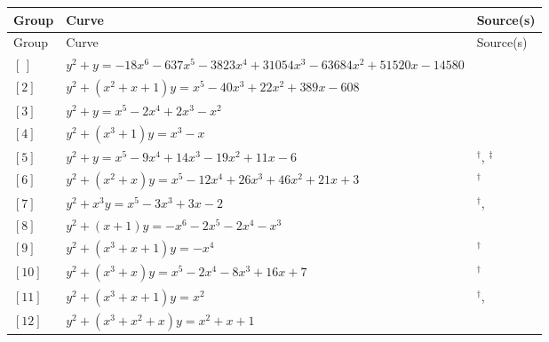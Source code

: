 \documentclass[11pt]{amsart}
\begin{document}
\begingroup\small
\renewcommand{\arraystretch}{1.25}
\begin{longtable}{|>{\raggedright\arraybackslash}p{1.7cm}|>{\raggedright\arraybackslash}p{}|>{\raggedright\arraybackslash}p{2.1cm}|}
\hline
Group & Curve & Source(s)\\ \hline
\endfirsthead
\hline
Group & Curve & Source(s)\\ \hline
\endhead
$[\,]$ & \href{https://alpha.lmfdb.org/Genus2Curve/Q/?jump=[[-14580,51520,-63684,31054,-3823,-637,-18],[1]]}{$y^2 + y = -18x^{6}-637x^{5}-3823x^{4}+31054x^{3}-63684x^{2}+51520x-14580$} & \cite{BSSVY}\\ \hline
$[2]$ & \href{https://www.lmfdb.org/Genus2Curve/Q/295/a/295/2}{$y^2 + (x^{2}+x+1)y = x^{5}-40x^{3}+22x^{2}+389x-608$} & \cite{BSSVY}\\ \hline
$[3]$ & \href{https://www.lmfdb.org/Genus2Curve/Q/997/b/997/1}{$y^2 + y = x^{5}-2x^{4}+2x^{3}-x^{2}$} & \cite{BSSVY}\\ \hline
$[4]$ & \href{https://www.lmfdb.org/Genus2Curve/Q/1070/a/2140/1}{$y^2 + (x^{3}+1)y = x^{3}-x$} & \cite{BSSVY}\\ \hline
$[5]$ & \href{https://www.lmfdb.org/Genus2Curve/Q/277/a/277/2}{$y^2 + y = x^{5}-9x^{4}+14x^{3}-19x^{2}+11x-6$} & \cite{Ogg1973}$^\dagger$, \cite{BoxallGrant2000}$^\ddagger$\\ \hline
$[6]$ & \href{https://www.lmfdb.org/Genus2Curve/Q/1038/a/1038/1}{$y^2 + (x^{2}+x)y = x^{5}-12x^{4}+26x^{3}+46x^{2}+21x+3$} & \cite{Flynn1991}$^\dagger$\\ \hline
$[7]$ & \href{https://www.lmfdb.org/Genus2Curve/Q/461/a/461/1}{$y^2 + x^{3}y = x^{5}-3x^{3}+3x-2$} & \cite{Ogg1973}$^\dagger$, \cite{LPS2004}\\ \hline
$[8]$ & \href{https://www.lmfdb.org/Genus2Curve/Q/464/a/464/1}{$y^2 + (x+1)y = -x^{6}-2x^{5}-2x^{4}-x^{3}$} & \cite{BSSVY}\\ \hline
$[9]$ & \href{https://www.lmfdb.org/Genus2Curve/Q/713/b/713/1}{$y^2 + (x^{3}+x+1)y = -x^{4}$} & \cite{Flynn1991}$^\dagger$\\ \hline
$[10]$ & \href{https://www.lmfdb.org/Genus2Curve/Q/389/a/389/1}{$y^2 + (x^{3}+x)y = x^{5}-2x^{4}-8x^{3}+16x+7$} & \cite{Flynn1991}$^\dagger$\\ \hline
$[11]$ & \href{https://www.lmfdb.org/Genus2Curve/Q/353/a/353/1}{$y^2 + (x^{3}+x+1)y = x^{2}$} & \cite{Ogg1973}$^\dagger$, \cite{BLP2009}\\ \hline
$[12]$ & \href{https://www.lmfdb.org/Genus2Curve/Q/762/a/3048/1}{$y^2 + (x^{3}+x^{2}+x)y = x^{2}+x+1$} & \cite{BSSVY}\\ \hline

\end{longtable}
\end{document}
